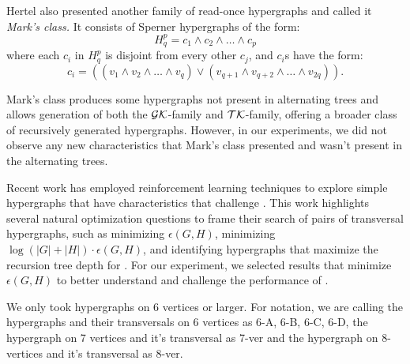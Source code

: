 Hertel also presented another family of read-once hypergraphs and called it \emph{Mark's class.} It consists of Sperner hypergraphs of the form:
\[
H_q^p=c_1\wedge c_2\wedge\dots\wedge c_p
\]
where each $c_i$ in $H_q^p$ is disjoint from every other $c_j$, and $c_i$s have the form:
\[
c_i=((v_1\wedge v_2\wedge\dots\wedge v_q)\vee(v_{q+1}\wedge v_{q+2}\wedge\dots\wedge v_{2q})).
\]

Mark's class produces some hypergraphs not present in alternating trees and allows generation of both the $\mathcal{GK}$-family and $\mathcal{TK}$-family, offering a broader class of recursively generated hypergraphs. However, in our experiments, we did not observe any new characteristics that Mark's class presented and wasn't present in the alternating trees.

Recent work \cite{SS24} has employed reinforcement learning techniques to explore simple hypergraphs that have characteristics that challenge \FKA. This work highlights several natural optimization questions to frame their search of pairs of transversal hypergraphs, such as minimizing $\epsilon(G,H)$, minimizing $\log(|G|+|H|)\cdot\epsilon(G,H)$, and identifying hypergraphs that maximize the recursion tree depth for \FKA. For our experiment, we selected results that minimize $\epsilon(G,H)$ to better understand and challenge the performance of \FKA.

We only took hypergraphs on 6 vertices or larger. For notation, we are calling the hypergraphs and their transversals on 6 vertices as 6-A, 6-B, 6-C, 6-D, the hypergraph on 7 vertices and it's transversal as 7-ver and the hypergraph on 8-vertices and it's transversal as 8-ver.

